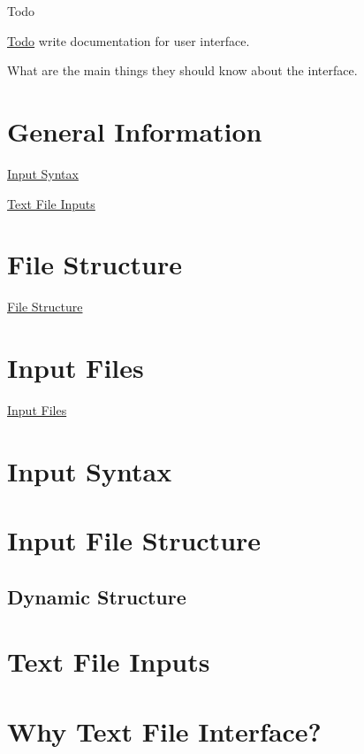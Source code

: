 \begin{DoxyRefDesc}{Todo}
\item[\hyperlink{todo__todo000038}{Todo}]write documentation for user interface.
\begin{DoxyItemize}
\item What are the main things they should know about the interface.
\end{DoxyItemize}\end{DoxyRefDesc}


\section*{General Information}

\hyperlink{input_syntax}{Input Syntax}

\hyperlink{why_text_files}{Text File Inputs}

\section*{File Structure}

\hyperlink{file_structure}{File Structure}

\section*{Input Files}

\hyperlink{input_files}{Input Files} \hypertarget{input_syntax}{}\section{Input Syntax}\label{input_syntax}
\section*{Input File Structure}

\subsection*{Dynamic Structure}\hypertarget{why_text_files}{}\section{Text File Inputs}\label{why_text_files}
\section*{Why Text File Interface?}

